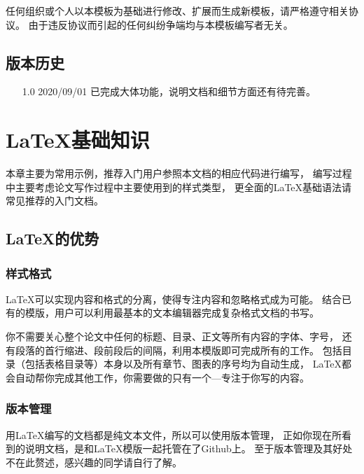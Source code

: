 任何组织或个人以本模板为基础进行修改、扩展而生成新模板，请严格遵守相关协议。
由于违反协议而引起的任何纠纷争端均与本模板编写者无关。

\section{版本历史}
\begin{itemize}
    \item[1.0] 2020/09/01 已完成大体功能，说明文档和细节方面还有待完善。
\end{itemize}
\chapter{\LaTeX{}基础知识}
\label{chapter-basic}

本章主要为常用示例，推荐入门用户参照本文档的相应代码进行编写，
编写过程中主要考虑论文写作过程中主要使用到的样式类型，
更全面的\LaTeX{}基础语法请常见推荐的入门文档。

\section{\LaTeX{}的优势}
\label{sec-latex-advantage}

\subsection{样式格式}
\label{subsec-style}

\LaTeX{}可以实现内容和格式的分离，使得专注内容和忽略格式成为可能。
结合已有的模版，用户可以利用最基本的文本编辑器完成复杂格式文档的书写。

你不需要关心整个论文中任何的标题、目录、正文等所有内容的字体、字号，
还有段落的首行缩进、段前段后的间隔，利用本模版即可完成所有的工作。
包括目录（包括表格目录等）本身以及所有章节、图表的序号均为自动生成，
\LaTeX{}都会自动帮你完成其他工作，你需要做的只有一个---专注于你写的内容。

\subsection{版本管理}
\label{subsec-version-control}

用\LaTeX{}编写的文档都是纯文本文件，所以可以使用版本管理，
正如你现在所看到的说明文档，是和\LaTeX{}模版一起托管在了Github上。
至于版本管理及其好处不在此赘述，感兴趣的同学请自行了解。

